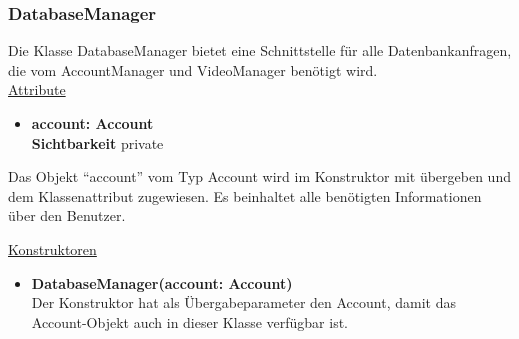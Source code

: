 \subsubsection{DatabaseManager} \label{service:klasse:DatabaseManager}
Die Klasse DatabaseManager bietet eine Schnittstelle für alle Datenbankanfragen, die vom AccountManager und VideoManager benötigt wird. \hfill\\

\underline{Attribute}
\begin{itemize}
\itemsep0pt
\item \textbf{account: Account} \hfill\\ 
\textbf{Sichtbarkeit} private
\end{itemize}

Das Objekt ``account'' vom Typ Account wird im Konstruktor mit übergeben und dem Klassenattribut zugewiesen. Es beinhaltet alle benötigten Informationen über den Benutzer. 

\underline{Konstruktoren}
\begin{itemize}
\itemsep0pt
\item \textbf{DatabaseManager(account: Account)} \hfill\\
Der Konstruktor hat als Übergabeparameter den Account, damit das Account-Objekt auch in dieser Klasse verfügbar ist.
\end{itemize}

